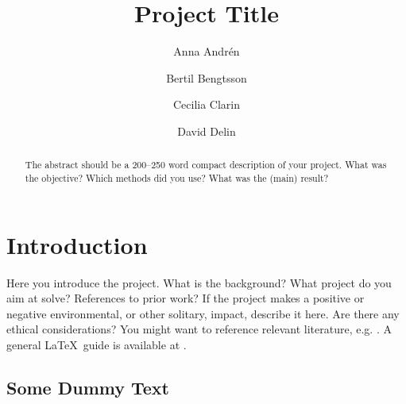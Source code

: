 \documentclass{LTHtwocol} %
\begin{document}
\begin{frontmatter}
\title{Project Title} %

\author[anna]{Anna Andrén}
\author[bertil]{Bertil Bengtsson}
\author[cecilia]{Cecilia Clarin}
\author[david]{David Delin}



\begin{abstract}
    The abstract should be a 200--250 word compact description of your project. What was the objective? Which methods did you use? What was the (main) result?
\end{abstract}

\end{frontmatter}


\section{Introduction}
Here you introduce the project. What is the background? What project do you aim at solve? References to prior work? If the project makes a positive or negative environmental, or other solitary, impact, describe it here. Are there any ethical considerations? You might want to reference relevant literature, e.g. \cite{openclosed2, Hellerstein2004, Yun2015}. A general \LaTeX\ guide is available at \cite{latexwiki}. 

\subsection{Some Dummy Text}
\kant[1] %
\end{document}
